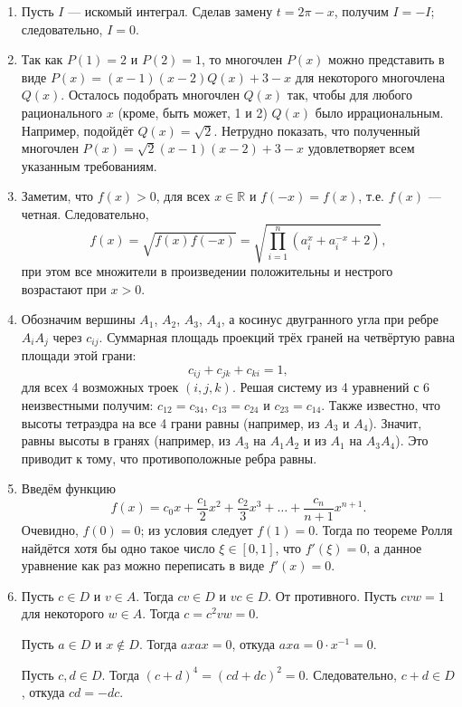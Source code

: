 \begin{enumerate}
\item Пусть $I$ --- искомый интеграл. Сделав замену $t=2\pi-x$, получим $I=-I$; следовательно, $I=0$.

\item Так как $P(1) = 2$ и $P(2) = 1$, то многочлен $P(x)$ можно представить в виде $P(x)=(x-1)(x-2)Q(x)+3-x$ для некоторого многочлена $Q(x)$. Осталось подобрать многочлен $Q(x)$ так, чтобы для любого рационального $x$ (кроме, быть может, 1 и 2) $Q(x)$ было иррациональным. Например, подойдёт $Q(x)=\sqrt 2$. Нетрудно показать, что полученный многочлен $P(x)=\sqrt 2(x-1)(x-2)+3-x$ удовлетворяет всем указанным требованиям.

\item Заметим, что $f(x) > 0$, для всех $x \in \mathbb{R}$ и $f(-x) = f(x)$, т.е. $f(x)$ --- четная. Следовательно,
$$f(x) = \sqrt{f(x) f(-x)} = \sqrt{\prod_{i=1}^{n}(a_i^x + a_i^{-x} + 2)},$$  
при этом все множители в произведении положительны и нестрого возрастают при $x >0$.

\item Обозначим вершины $A_1$, $A_2$, $A_3$, $A_4$, а косинус двугранного угла при ребре $A_iA_j$ через $c_{ij}$. Суммарная площадь проекций трёх граней на четвёртую равна площади этой грани:
$$c_{ij} + c_{jk} + c_{ki} = 1,$$
для всех 4 возможных троек $(i, j, k)$. Решая систему из 4 уравнений с 6 неизвестными получим: $c_{12} = c_{34}$, $c_{13} = c_{24}$ и $c_{23} = c_{14}$. Также известно, что высоты тетраэдра на все 4 грани равны (например, из $A_3$ и $A_4$). Значит, равны высоты в гранях (например, из $A_3$ на $A_1A_2$ и из $A_1$ на $A_3A_4$). Это приводит к тому, что противоположные ребра равны.


\item Введём функцию
$$
f(x)=c_0x + \frac{c_1}{2}x^2 + \frac{c_2}{3}x^3 + \hdots + \frac{c_n}{n + 1}x^{n+1}.
$$
Очевидно, $f(0)=0$; из условия следует $f(1)=0$. Тогда по теореме Ролля найдётся хотя бы одно такое число $\xi\in[0,1]$, что $f'(\xi)=0$, а данное уравнение как раз можно переписать в виде $f'(x)=0$. 

\item Пусть $c \in D$ и $v \in A$. Тогда $cv \in D$ и $vc \in D$. От противного. Пусть $ cvw = 1$ для некоторого $w \in A$. Тогда $c = c^2 v w = 0$.

Пусть $a \in D$ и $x \not \in D$. Тогда $axax = 0$, откуда $a x a = 0 \cdot x^{-1} = 0$.

Пусть $c, d \in D$. Тогда $(c + d)^4 = (cd + dc)^2 = 0$. Следовательно, $c + d \in D$, откуда $cd = -dc$.


\end{enumerate}
